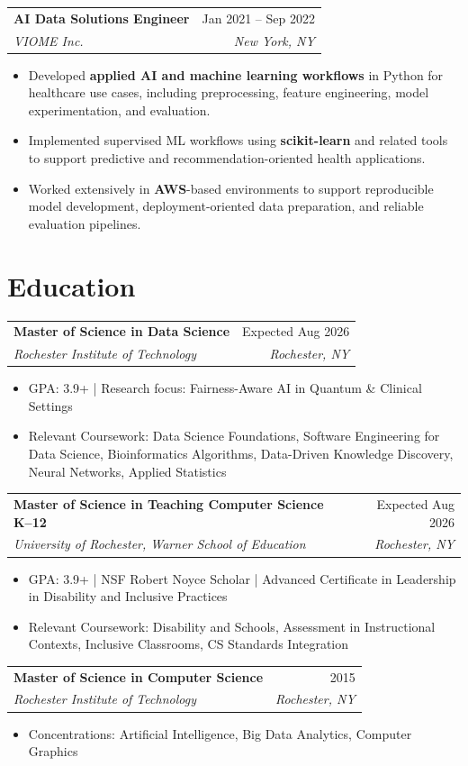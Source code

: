 \documentclass[10pt]{article}
\makeatletter
\newcommand{\resumeItem}[1]{\item\small{#1}}
\newcommand{\resumeSubheading}[4]{
  \vspace{4pt}
  \noindent
  \begin{tabular*}{\textwidth}[t]{@{}l@{\extracolsep{\fill}}r@{}}
    \textbf{#1} & #2 \\
    \textit{\small #3} & \textit{\small #4} \\
  \end{tabular*}\vspace{-4pt}
}
\makeatother
\begin{document}
\resumeSubheading
{AI Data Solutions Engineer}{Jan 2021 -- Sep 2022}
{VIOME Inc.}{New York, NY}
\begin{itemize}[leftmargin=1.2em]
\resumeItem{Developed \textbf{applied AI and machine learning workflows} in Python for healthcare use cases, including preprocessing, feature engineering, model experimentation, and evaluation.}
\resumeItem{Implemented supervised ML workflows using \textbf{scikit-learn} and related tools to support predictive and recommendation-oriented health applications.}
\resumeItem{Worked extensively in \textbf{AWS}-based environments to support reproducible model development, deployment-oriented data preparation, and reliable evaluation pipelines.}
\end{itemize}


\section{Education}

\resumeSubheading
{Master of Science in Data Science}{Expected Aug 2026}
{Rochester Institute of Technology}{Rochester, NY}
\begin{itemize}[leftmargin=1.2em]
\resumeItem{GPA: 3.9+ \;|\; Research focus: Fairness-Aware AI in Quantum \& Clinical Settings}
\resumeItem{Relevant Coursework: Data Science Foundations, Software Engineering for Data Science, Bioinformatics Algorithms, Data-Driven Knowledge Discovery, Neural Networks, Applied Statistics}
\end{itemize}

\resumeSubheading
{Master of Science in Teaching Computer Science K--12}{Expected Aug 2026}
{University of Rochester, Warner School of Education}{Rochester, NY}
\begin{itemize}[leftmargin=1.2em]
\resumeItem{GPA: 3.9+ \;|\; NSF Robert Noyce Scholar \;|\; Advanced Certificate in Leadership in Disability and Inclusive Practices}
\resumeItem{Relevant Coursework: Disability and Schools, Assessment in Instructional Contexts, Inclusive Classrooms, CS Standards Integration}
\end{itemize}

\resumeSubheading
{Master of Science in Computer Science}{2015}
{Rochester Institute of Technology}{Rochester, NY}
\begin{itemize}[leftmargin=1.2em]
\resumeItem{Concentrations: Artificial Intelligence, Big Data Analytics, Computer Graphics}
\end{itemize}
\end{document}
